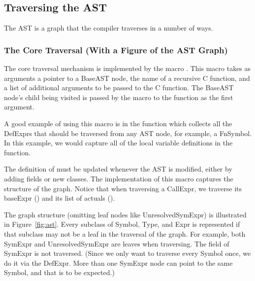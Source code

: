 \documentclass[10pt]{article}
\begin{document}
\subsection{Traversing the AST}
\label{sec:traverse}

The AST is a graph that the compiler traverses in a number of ways.

\subsubsection{The Core Traversal (With a Figure of the AST Graph)}

The core traversal mechanism is implemented by the macro
.  This macro takes as arguments a pointer to a
BaseAST node, the name of a recursive C function, and a list of
additional arguments to be passed to the C function.  The BaseAST
node's child being visited is passed by the macro to the function as
the first argument.

A good example of using this macro is in the function
 which collects all the DefExprs that should be
traversed from any AST node, for example, a FnSymbol.  In this
example, we would capture all of the local variable definitions in the
function.

The definition of  must be updated whenever the
AST is modified, either by adding fields or new classes.  The
implementation of this macro captures the structure of the graph.
Notice that when traversing a CallExpr, we traverse its baseExpr
() and its list of actuals ().

The graph structure (omitting leaf nodes like UnresolvedSymExpr) is
illustrated in Figure~\ref{fig:ast}.  Every subclass of Symbol, Type,
and Expr is represented if that subclass may not be a leaf in the
traversal of the graph.  For example, both SymExpr and
UnresolvedSymExpr are leaves when traversing.  The  field of
SymExpr is not traversed.  (Since we only want to traverse every
Symbol once, we do it via the DefExpr.  More than one SymExpr node can
point to the same Symbol, and that is to be expected.)
\end{document}

